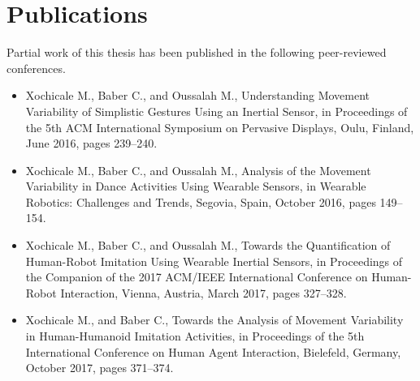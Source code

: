 \section{Publications}
Partial work of this thesis has been published in the following peer-reviewed 
conferences.
\begin{itemize}
\item Xochicale M., Baber C., and Oussalah M.,
	Understanding Movement Variability of Simplistic Gestures Using 
	an Inertial Sensor, in Proceedings of the 5th ACM International 
	Symposium on Pervasive Displays, 
	Oulu, Finland, June 2016, 
	pages 239--240.

\item Xochicale M., Baber C., and Oussalah M.,
	Analysis of the Movement Variability in Dance Activities Using 
	Wearable Sensors,
	in Wearable Robotics: Challenges and Trends,
	Segovia, Spain, October 2016,
	pages 149--154.

\item Xochicale M., Baber C., and Oussalah M.,
	Towards the Quantification of Human-Robot Imitation Using Wearable 
	Inertial Sensors, in Proceedings of the Companion of the 2017 
	ACM/IEEE International Conference on Human-Robot Interaction,
	Vienna, Austria, March 2017,
	pages 327--328.

\item Xochicale M., and Baber C.,
	Towards the Analysis of Movement Variability in Human-Humanoid 
	Imitation Activities, in Proceedings of the 5th International 
	Conference on Human Agent Interaction,
	Bielefeld, Germany, October 2017,
	pages 371--374.
\end{itemize}


